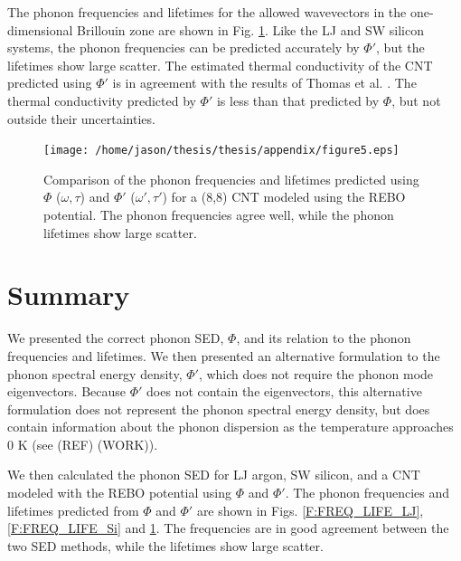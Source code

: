The phonon frequencies and lifetimes for the allowed wavevectors in the 
one-dimensional Brillouin 
zone are shown in Fig. \ref{F:FREQ_LIFE_CNT}. Like the LJ and SW silicon 
systems, the 
phonon frequencies can be predicted accurately by $\Phi'$, but the 
lifetimes show large scatter. 
The estimated thermal conductivity of the CNT predicted using $\Phi'$ is 
in agreement with the 
results of Thomas et al. \cite{thomas_predicting_2010}. 
The thermal conductivity 
predicted by $\Phi'$ is less 
than that predicted by $\Phi$, but not outside their uncertainties.

\vspace*{1mm}
\begin{figure}
\begin{center}
\texttt{[image: /home/jason/thesis/thesis/appendix/figure5.eps]}
\vspace*{0mm}
\end{center}
\caption{\label{F:FREQ_LIFE_CNT} Comparison of the phonon frequencies and 
lifetimes predicted 
using $\Phi$ ($\omega,\tau$) and $\Phi'$ ($\omega',\tau'$) for a (8,8) CNT 
modeled using the REBO 
potential. The phonon frequencies agree well, while the phonon lifetimes 
show large scatter.}
\end{figure}
\vspace*{1mm}
\section{\label{Section_Conclusions}Summary}
We presented the correct phonon SED, $\Phi$, and its relation to the phonon 
frequencies and lifetimes. 
We then presented an alternative formulation to the 
phonon spectral energy density, $\Phi'$, which does not require the phonon 
mode eigenvectors.  
Because $\Phi'$ does not contain the eigenvectors, this alternative 
formulation does not represent 
the phonon spectral energy density, but does contain information about 
the phonon dispersion as the 
temperature approaches $0$ K (see (REF) (WORK)).

We then calculated the phonon SED for LJ argon, SW silicon, and a CNT 
modeled with the REBO 
potential using $\Phi$ and $\Phi'$. The phonon frequencies and
lifetimes predicted from $\Phi$ and $\Phi'$ are shown in Figs$.$ 
\ref{F:FREQ_LIFE_LJ}, 
\ref{F:FREQ_LIFE_Si} and \ref{F:FREQ_LIFE_CNT}. The
frequencies are in good agreement between the two SED methods, while the 
lifetimes show large scatter.


